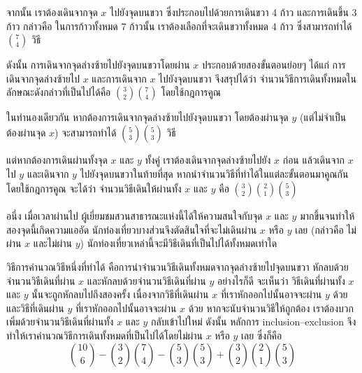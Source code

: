 \documentclass[a4paper,12pt,twoside]{article}
\begin{document}
\begin{example}
จากนั้น เราต้องเดินจากจุด $x$ ไปยังจุดบนขวา ซึ่งประกอบไปด้วยการเดินขวา 4 ก้าว และการเดินขึ้น 3 ก้าว กล่าวคือ ในการก้าวทั้งหมด 7 ก้าวนั้น เราต้องเลือกที่จะเดินขวาทั้งหมด 4 ก้าว ซึ่งสามารถทำได้ $\binom{7}{4}$ วิธี

ดังนั้น การเดินจากจุดล่างซ้ายไปยังจุดบนขวาโดยผ่าน $x$ ประกอบด้วยสองขั้นตอนย่อยๆ ได้แก่ การเดินจากจุดล่างซ้ายไป $x$ และการเดินจาก $x$ ไปยังจุดบนขวา จึงสรุปได้ว่า จำนวนวิธีการเดินทั้งหมดในลักษณะดังกล่าวที่เป็นไปได้คือ $\binom{3}{2}\binom{7}{4}$ โดยใช้กฎการคูณ

ในทำนองเดียวกัน หากต้องการเดินจากจุดล่างซ้ายไปยังจุดบนขวา โดยต้องผ่านจุด $y$ (แต่ไม่จำเป็นต้องผ่านจุด $x$) จะสามารถทำได้ $\binom{5}{3}\binom{5}{3}$ วิธี

แต่หากต้องการเดินผ่านทั้งจุด $x$ และ $y$ ทั้งคู่ เราต้องเดินจากจุดล่างซ้ายไปยัง $x$ ก่อน แล้วเดินจาก $x$ ไป $y$ และเดินจาก $y$ ไปยังจุดบนขวาในท้ายที่สุด \enskip หากนำจำนวนวิธีที่ทำได้ในแต่ละขั้นตอนมาคูณกันโดยใช้กฎการคูณ จะได้ว่า จำนวนวิธีเดินให้ผ่านทั้ง $x$ และ $y$ คือ $\binom{3}{2}\binom{2}{1}\binom{5}{3}$

อนึ่ง เมื่อเวลาผ่านไป ผู้เยี่ยมชมสวนสาธารณะแห่งนี้ได้ให้ความสนใจกับจุด $x$ และ $y$ มากขึ้นจนทำให้สองจุดนี้เกิดความแออัด \enskip นักท่องเที่ยวบางส่วนจึงตัดสินใจที่จะไม่เดินผ่าน $x$ หรือ $y$ เลย (กล่าวคือ ไม่ผ่าน $x$ และไม่ผ่าน $y$) \enskip นักท่องเที่ยวเหล่านี้จะมีวิธีเดินที่เป็นไปได้ทั้งหมดเท่าใด

วิธีการคำนวณวิธีหนึ่งที่ทำได้ คือการนำจำนวนวิธีเดินทั้งหมดจากจุดล่างซ้ายไปจุดบนขวา หักลบด้วยจำนวนวิธีเดินที่ผ่าน $x$ และหักลบด้วยจำนวนวิธีเดินที่ผ่าน $y$ 
\enskip อย่างไรก็ดี จะเห็นว่า วิธีเดินที่ผ่านทั้ง $x$ และ $y$ นั้นจะถูกหักลบไปถึงสองครั้ง เนื่องจากวิธีที่เดินผ่าน $x$ ที่เราหักออกไปนั้นอาจจะผ่าน $y$ ด้วย และวิธีที่เดินผ่าน $y$ ที่เราหักออกไปนั้นอาจจะผ่าน $x$ ด้วย \enskip หากจะนับจำนวนวิธีให้ถูกต้อง เราต้องบวกเพิ่มด้วยจำนวนวิธีเดินที่ผ่านทั้ง $x$ และ $y$ กลับเข้าไปใหม่ \enskip ดังนั้น หลักการ inclusion--exclusion จึงทำให้เราคำนวณวิธีการเดินทั้งหมดที่เป็นไปได้โดยไม่ผ่าน $x$ หรือ $y$ เลย ซึ่งก็คือ
\[\binom{10}{6}-\binom{3}{2}\binom{7}{4}-\binom{5}{3}\binom{5}{3}+\binom{3}{2}\binom{2}{1}\binom{5}{3}\]
\end{example}
\end{document}
